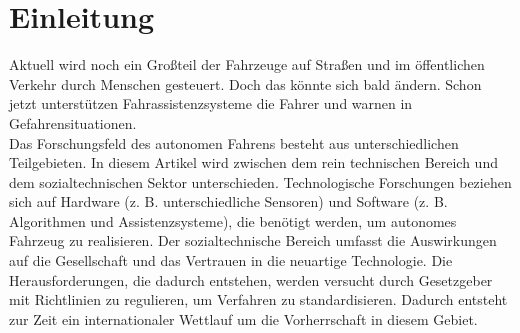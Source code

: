 \section{Einleitung}

Aktuell wird noch ein Großteil der Fahrzeuge auf Straßen und im öffentlichen Verkehr durch Menschen gesteuert. Doch das könnte sich bald ändern. Schon jetzt unterstützen Fahrassistenzsysteme die Fahrer und warnen in Gefahrensituationen.\\

Das Forschungsfeld des autonomen Fahrens besteht aus unterschiedlichen Teilgebieten. In diesem Artikel wird zwischen dem rein technischen Bereich und dem sozialtechnischen Sektor unterschieden. Technologische Forschungen beziehen sich auf Hardware (z. B. unterschiedliche Sensoren) und Software (z. B. Algorithmen und Assistenzsysteme), die benötigt werden, um autonomes Fahrzeug zu realisieren. Der sozialtechnische Bereich umfasst die Auswirkungen auf die Gesellschaft und das Vertrauen in die neuartige Technologie. Die Herausforderungen, die dadurch entstehen, werden versucht durch Gesetzgeber mit Richtlinien zu regulieren, um Verfahren zu standardisieren. Dadurch entsteht zur Zeit ein internationaler Wettlauf um die Vorherrschaft in diesem Gebiet.\\